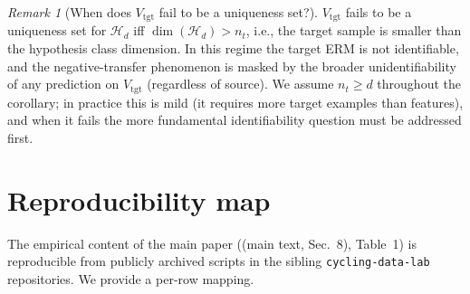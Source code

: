 \documentclass[11pt,a4paper]{article}
\theoremstyle{plain}
\theoremstyle{definition}
\theoremstyle{remark}
\newtheorem{remark}[theorem]{Remark}
\newcommand{\Hcal}{\mathcal{H}}
\newcommand{\maintext}[1]{(main text, Sec.~#1)}
\begin{document}
\begin{remark}[When does $V_{\mathrm{tgt}}$ fail to be a uniqueness set?]
\label{rem:si-uniqueness-failure}
$V_{\mathrm{tgt}}$ fails to be a uniqueness set for $\Hcal_d$ iff
$\dim(\Hcal_d) > n_t$, i.e., the target sample is smaller than the
hypothesis class dimension.  In this regime the target ERM is not
identifiable, and the negative-transfer phenomenon is masked by the
broader unidentifiability of any prediction on $V_{\mathrm{tgt}}$
(regardless of source). We assume $n_t \geq d$ throughout the
corollary; in practice this is mild (it requires more target
examples than features), and when it fails the more fundamental
identifiability question must be addressed first.
\end{remark}

\section{Reproducibility map}
\label{sec:si-D}

The empirical content of the main paper
(\maintext{8}, Table~1) is reproducible from publicly archived
scripts in the sibling \texttt{cycling-data-lab} repositories.  We
provide a per-row mapping.
\end{document}

